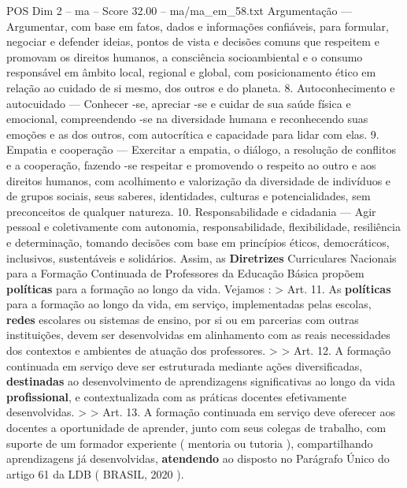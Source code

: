 \begin{textsample}{POS Dim 2 – ma – Score 32.00 – ma/ma\_em\_58.txt}
Argumentação — Argumentar, com base em fatos, dados e informações confiáveis, para formular, negociar e defender ideias, pontos de vista e decisões comuns que respeitem e promovam os direitos humanos, a consciência socioambiental e o consumo responsável em âmbito local, regional e global, com posicionamento ético em relação ao cuidado de si mesmo, dos outros e do planeta. 8.
Autoconhecimento e autocuidado — Conhecer -se, apreciar -se e cuidar de sua saúde física e emocional, compreendendo -se na diversidade humana e reconhecendo suas emoções e as dos outros, com autocrítica e capacidade para lidar com elas. 9.
Empatia e cooperação — Exercitar a empatia, o diálogo, a resolução de conflitos e a cooperação, fazendo -se respeitar e promovendo o respeito ao outro e aos direitos humanos, com acolhimento e valorização da diversidade de indivíduos e de grupos sociais, seus saberes, identidades, culturas e potencialidades, sem preconceitos de qualquer natureza. 10.
Responsabilidade e cidadania — Agir pessoal e coletivamente com autonomia, responsabilidade, flexibilidade, resiliência e determinação, tomando decisões com base em princípios éticos, democráticos, inclusivos, sustentáveis e solidários.
Assim, as \textbf{Diretrizes} Curriculares Nacionais para a Formação Continuada de Professores da Educação Básica propõem \textbf{políticas} para a formação ao longo da vida.
Vejamos : > Art. 11.
As \textbf{políticas} para a formação ao longo da vida, em serviço, implementadas pelas escolas, \textbf{redes} escolares ou sistemas de ensino, por si ou em parcerias com outras instituições, devem ser desenvolvidas em alinhamento com as reais necessidades dos contextos e ambientes de atuação dos professores. > > Art. 12.
A formação continuada em serviço deve ser estruturada mediante ações diversificadas, \textbf{destinadas} ao desenvolvimento de aprendizagens significativas ao longo da vida \textbf{profissional}, e contextualizada com as práticas docentes efetivamente desenvolvidas. > > Art. 13.
A formação continuada em serviço deve oferecer aos docentes a oportunidade de aprender, junto com seus colegas de trabalho, com suporte de um formador experiente ( mentoria ou tutoria ), compartilhando aprendizagens já desenvolvidas, \textbf{atendendo} ao disposto no Parágrafo Único do artigo 61 da LDB ( BRASIL, 2020 ).

\end{textsample}
